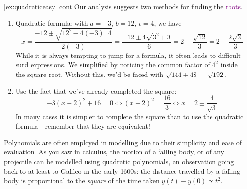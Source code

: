 \begin{example*}{\ref{ex:quadraticeasy} cont}{}
Our analysis suggests two methods for finding the \textcolor{purple}{roots}.
\begin{enumerate}
  \item Quadratic formula: with $a=-3$, $b=12$, $c=4$, we have
  \[x=\dfrac{-12\pm\sqrt{12^2-4(-3)\cdot 4}}{2(-3)} =\dfrac{-12\pm 4\sqrt{3^2+3}}{-6} =2\pm\dfrac{\sqrt{12}}{3} =2\pm\dfrac{2\sqrt{3}}{3}\]
  While it is always tempting to jump for a formula, it often leads to difficult surd expressions. We simplified by noticing the common factor of $4^2$ inside the square root. Without this, we'd be faced with $\sqrt{144+48}=\sqrt{192}$.
  \item Use the fact that we've already completed the square:
  \[-3(x-2)^2+16=0\iff (x-2)^2=\frac{16}3\iff x=2\pm\frac 4{\sqrt 3}\]
  In many cases it is simpler to complete the square than to use the quadratic formula---remember that they are equivalent!
\end{enumerate}
\end{example*}


Polynomials are often employed in modelling due to their simplicity and ease of evaluation. As you saw in calculus, the motion of a falling body, or of any projectile can be modelled using quadratic polynomials, an observation going back to at least to Galileo in the early 1600s: the distance travelled by a falling body is proportional to the \emph{square} of the time taken $y(t)-y(0)\propto t^2$.

